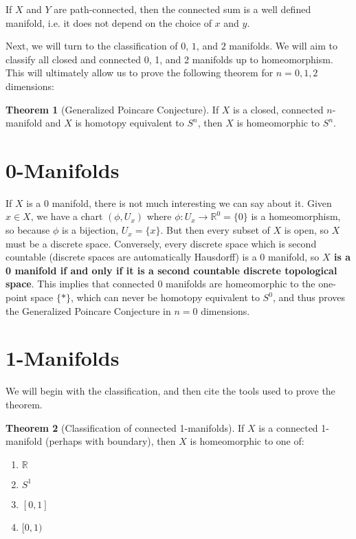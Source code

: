 \documentclass[11pt, oneside]{amsart}   	%
\theoremstyle{definition}
\newtheorem{theorem}{Theorem}[section]
\begin{document}
	If $X$ and $Y$ are path-connected, then the connected sum is a well defined manifold, i.e. it does not depend on the choice of $x$ and $y$.
	
	Next, we will turn to the classification of $0$, $1$, and $2$ manifolds. We will aim to classify all closed and connected 0, 1, and 2 manifolds up to 
	homeomorphism. This will ultimately allow us to prove the following theorem for $n = 0, 1, 2$ dimensions:
	
	\begin{theorem}[Generalized Poincare Conjecture]
		If $X$ is a closed, connected $n$-manifold and $X$ is homotopy equivalent to $S^n$, then $X$ is homeomorphic to $S^n$.
	\end{theorem}

\section{0-Manifolds}

	If $X$ is a 0 manifold, there is not much interesting we can say about it. Given $x\in X$, we have a chart $(\phi, U_x)$ where $\phi : U_x\rightarrow \mathbb 
	R^0 = \{0\}$ is a homeomorphism, so because $\phi$ is a bijection, $U_x = \{x\}$. But then every subset of $X$ is open, so $X$ must be a discrete space. 
	Conversely, every discrete space which is second countable (discrete spaces are automatically Hausdorff) is a 0 manifold, so \textbf{$X$ is a 0 manifold if 
	and only if it is a second countable discrete topological space}. This implies that connected $0$ manifolds are homeomorphic to the one-point space $\{*\}$, 
	which can never be homotopy equivalent to $S^0$, and thus proves the Generalized Poincare Conjecture in $n = 0$ dimensions.

\section{1-Manifolds}

	We will begin with the classification, and then cite the tools used to prove the theorem.
	
	\begin{theorem}[Classification of connected 1-manifolds]
		If $X$ is a connected 1-manifold (perhaps with boundary), then $X$ is homeomorphic to one of:
		\begin{enumerate}
			\item $\mathbb R$
			\item $S^1$
			\item $[0, 1]$
			\item $[0, 1)$
		\end{enumerate}
	\end{theorem}
	
\end{document}
